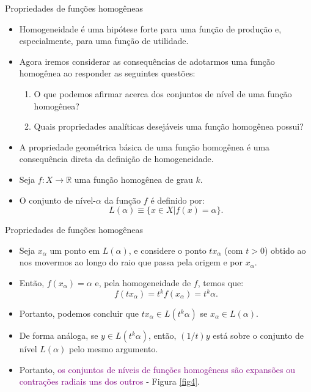 \documentclass[10pt]{beamer}
\begin{document}
\begin{frame}{Propriedades de funções homogêneas}
    \begin{itemize}
        \item Homogeneidade é uma hipótese forte para uma função de produção e, especialmente, para uma função de utilidade.
        \bigskip
        \item Agora iremos considerar as consequências de adotarmos uma função homogênea ao responder as seguintes questões:     \bigskip
        \begin{enumerate}
            \item O que podemos afirmar acerca dos conjuntos de nível de uma função homogênea?\medskip
             
            \item Quais propriedades analíticas desejáveis uma função homogênea possui?     \bigskip
        \end{enumerate}
         
        \item A propriedade geométrica básica de uma função homogênea é uma consequência direta da definição de homogeneidade.
        \bigskip
        \item Seja $f: X \rightarrow \mathbb{R}$ uma função homogênea de grau $k$.
        \bigskip
        \item O conjunto de nível-$\alpha$ da função $f$ é definido por:
        \begin{equation}
            L(\alpha) \equiv \{x \in X| f(x) = \alpha\}.
            \label{eq4}
        \end{equation}
    \end{itemize}
\end{frame}

\begin{frame}{Propriedades de funções homogêneas}
    \begin{itemize}
        \item Seja $x_\alpha$ um ponto em $L(\alpha)$, e considere o ponto $t x_\alpha$ (com $t>0$) obtido ao nos movermos ao longo do raio que passa pela origem e por $x_\alpha$.
        \bigskip
        \item Então, $f(x_\alpha) = \alpha$ e, pela homogeneidade de $f$, temos que:
        \[
          f(t x_\alpha) = t^k f(x_\alpha) = t^k \alpha.  
        \]
         
        \item Portanto, podemos concluir que $t x_\alpha \in L(t^k \alpha)$ se $x_\alpha \in L(\alpha)$.
        \bigskip
        \item De forma análoga, se $y \in L(t^k \alpha)$, então, $(1/t)y$ está sobre o conjunto de nível $L(\alpha)$ pelo mesmo argumento.
        \bigskip
        \item Portanto, \textcolor{purple}{os conjuntos de níveis de funções homogêneas são expansões ou contrações radiais uns dos outros} - Figura \ref{fig4}.
    \end{itemize}
\end{frame}
\end{document}
